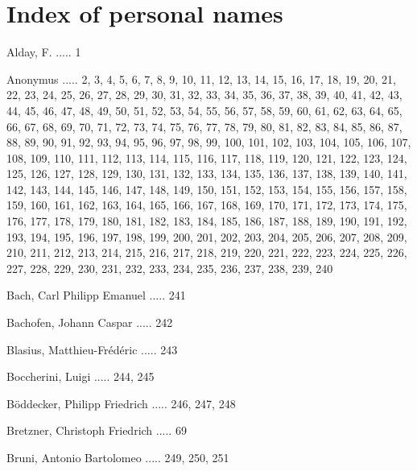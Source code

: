 \documentclass[twocolumn]{book}
\begin{document}
\chapter*{\centering Index of personal names}
\fancyhead{}


\newline 
Alday, F. ..... 1

\newline 
Anonymus ..... 2, 3, 4, 5, 6, 7, 8, 9, 10, 11, 12, 13, 14, 15, 16, 17, 18, 19, 20, 21, 22, 23, 24, 25, 26, 27, 28, 29, 30, 31, 32, 33, 34, 35, 36, 37, 38, 39, 40, 41, 42, 43, 44, 45, 46, 47, 48, 49, 50, 51, 52, 53, 54, 55, 56, 57, 58, 59, 60, 61, 62, 63, 64, 65, 66, 67, 68, 69, 70, 71, 72, 73, 74, 75, 76, 77, 78, 79, 80, 81, 82, 83, 84, 85, 86, 87, 88, 89, 90, 91, 92, 93, 94, 95, 96, 97, 98, 99, 100, 101, 102, 103, 104, 105, 106, 107, 108, 109, 110, 111, 112, 113, 114, 115, 116, 117, 118, 119, 120, 121, 122, 123, 124, 125, 126, 127, 128, 129, 130, 131, 132, 133, 134, 135, 136, 137, 138, 139, 140, 141, 142, 143, 144, 145, 146, 147, 148, 149, 150, 151, 152, 153, 154, 155, 156, 157, 158, 159, 160, 161, 162, 163, 164, 165, 166, 167, 168, 169, 170, 171, 172, 173, 174, 175, 176, 177, 178, 179, 180, 181, 182, 183, 184, 185, 186, 187, 188, 189, 190, 191, 192, 193, 194, 195, 196, 197, 198, 199, 200, 201, 202, 203, 204, 205, 206, 207, 208, 209, 210, 211, 212, 213, 214, 215, 216, 217, 218, 219, 220, 221, 222, 223, 224, 225, 226, 227, 228, 229, 230, 231, 232, 233, 234, 235, 236, 237, 238, 239, 240

\newline 
Bach, Carl Philipp Emanuel ..... 241

\newline 
Bachofen, Johann Caspar ..... 242

\newline 
Blasius, Matthieu-Frédéric ..... 243

\newline 
Boccherini, Luigi ..... 244, 245

\newline 
Böddecker, Philipp Friedrich ..... 246, 247, 248

\newline 
Bretzner, Christoph Friedrich ..... 69

\newline 
Bruni, Antonio Bartolomeo ..... 249, 250, 251
\end{document}
